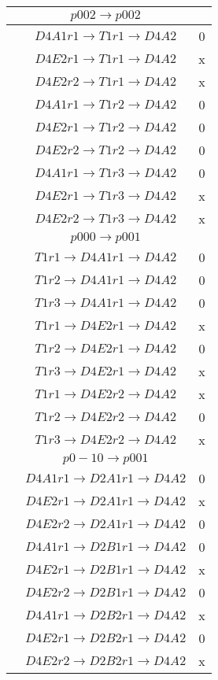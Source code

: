 \documentclass[10pt]{article}
\begin{document}
\begin{table}[!htbp]
\begin{minipage}[!htbp]{0.33\textwidth}
\begin{tabular}{cc c}
 &$p002 \rightarrow p002 $&\\  \hline
 & $D4A1 r1 \rightarrow T1 r1 \rightarrow D4A2$ & 0\\
 & $D4E2 r1 \rightarrow T1 r1 \rightarrow D4A2$ &  x\\
 & $D4E2 r2 \rightarrow T1 r1 \rightarrow D4A2$ &  x\\
 & $D4A1 r1 \rightarrow T1 r2 \rightarrow D4A2$ &  0\\
 & $D4E2 r1 \rightarrow T1 r2 \rightarrow D4A2$ &  0\\
 & $D4E2 r2 \rightarrow T1 r2 \rightarrow D4A2$ &  0\\
 & $D4A1 r1 \rightarrow T1 r3 \rightarrow D4A2$ &  0\\
 & $D4E2 r1 \rightarrow T1 r3 \rightarrow D4A2$ &  x\\
 & $D4E2 r2 \rightarrow T1 r3 \rightarrow D4A2$ &  x\\

\hline

 &$p000 \rightarrow p001 $& \\ \hline
 & $T1 r1 \rightarrow D4A1 r1 \rightarrow D4A2$ & 0\\
 & $T1 r2 \rightarrow D4A1 r1 \rightarrow D4A2$ &  0\\
 & $T1 r3 \rightarrow D4A1 r1 \rightarrow D4A2$ &  0\\
 & $T1 r1 \rightarrow D4E2 r1 \rightarrow D4A2$ &  x\\
 & $T1 r2 \rightarrow D4E2 r1 \rightarrow D4A2$ &  0\\
 & $T1 r3 \rightarrow D4E2 r1 \rightarrow D4A2$ &  x\\
 & $T1 r1 \rightarrow D4E2 r2 \rightarrow D4A2$ &  x\\
 & $T1 r2 \rightarrow D4E2 r2 \rightarrow D4A2$ &  0\\
 & $T1 r3 \rightarrow D4E2 r2 \rightarrow D4A2$ &  x\\

\hline

 &$p0-10 \rightarrow p001 $& \\ \hline
 & $D4A1 r1 \rightarrow D2A1 r1 \rightarrow D4A2$ & 0\\
 & $D4E2 r1 \rightarrow D2A1 r1 \rightarrow D4A2$ &  x\\
 & $D4E2 r2 \rightarrow D2A1 r1 \rightarrow D4A2$ &  0\\
 & $D4A1 r1 \rightarrow D2B1 r1 \rightarrow D4A2$ &  0\\
 & $D4E2 r1 \rightarrow D2B1 r1 \rightarrow D4A2$ &  x\\
 & $D4E2 r2 \rightarrow D2B1 r1 \rightarrow D4A2$ &  0\\
 & $D4A1 r1 \rightarrow D2B2 r1 \rightarrow D4A2$ &  x\\
 & $D4E2 r1 \rightarrow D2B2 r1 \rightarrow D4A2$ &  0\\
 & $D4E2 r2 \rightarrow D2B2 r1 \rightarrow D4A2$ &  x\\
 

\end{tabular}
\end{minipage}
\end{table}
\end{document}
